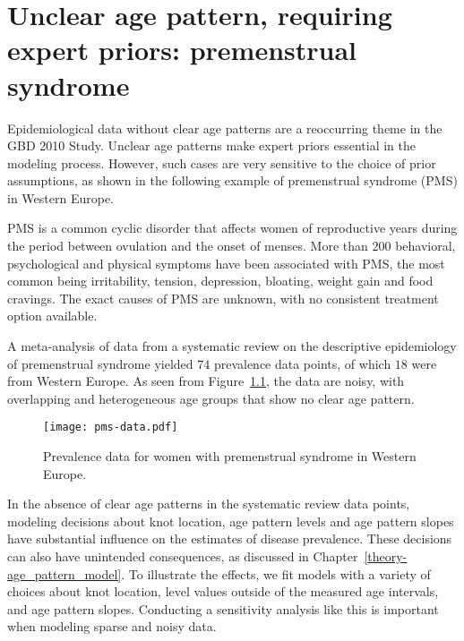 \chapter{Unclear age pattern, requiring expert priors: premenstrual syndrome}
\label{applications-priors_knots_select}

Epidemiological data without clear age patterns are a reoccurring
theme in the GBD 2010 Study.  Unclear age patterns make expert priors
essential in the modeling process.  However, such cases are very
sensitive to the choice of prior assumptions, as shown in the
following example of premenstrual syndrome (PMS) in Western Europe.

PMS is a common cyclic disorder that affects women of reproductive
years during the period between ovulation and the onset of menses.
More than $200$ behavioral, psychological and physical symptoms have been
associated with PMS, the most common being irritability, tension,
depression, bloating, weight gain and food cravings.  The exact causes
of PMS are unknown, with no consistent
treatment option available. \cite{dickerson_premenstrual_2003, singh_incidence_1998,
  goodale_alleviation_1990}

A meta-analysis of data from a systematic review on the descriptive
epidemiology of premenstrual syndrome yielded $74$ prevalence
data points, of which $18$ were from Western Europe.  As seen from
Figure~\ref{fig:app-pms_data}, the data are noisy, with overlapping and
heterogeneous age groups that show no clear age pattern.

    \begin{figure}[h]
        \begin{center}
            \texttt{[image: pms-data.pdf]}
            \caption{Prevalence data for women with premenstrual
              syndrome in Western Europe.}
        \end{center}
        \label{fig:app-pms_data}
    \end{figure}


In the absence of clear age patterns in the systematic review data
points, modeling decisions about knot location, age pattern levels and
age pattern slopes have substantial influence on the estimates of
disease prevalence.  These decisions can also have unintended
consequences, as discussed in Chapter~\ref{theory-age_pattern_model}.
To illustrate the effects, we fit models with a variety of choices
about knot location, level values outside of the measured age
intervals, and age pattern slopes.  Conducting a sensitivity analysis
like this is important when modeling sparse and noisy data.

